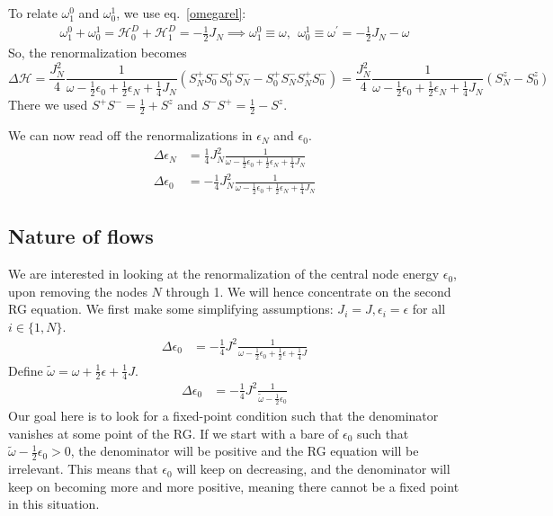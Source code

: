 To relate \(\omega_1^0\) and \(\omega_0^1\), we use eq.~\ref{omegarel}:
\begin{equation}\begin{aligned}
	\omega_1^0 + \omega_0^1 = \mathcal{H}^D_0 + \mathcal{H}^D_1 = -\frac{1}{2}J_N \implies \omega_1^0 \equiv \omega, ~ ~\omega_0^1 \equiv \omega^\prime = -\frac{1}{2}J_N - \omega
\end{aligned}\end{equation}
So, the renormalization becomes
\begin{equation}
	\Delta \mathcal{H} = \frac{J_N^2}{4}\frac{1}{\omega - \frac{1}{2}\epsilon_0  + \frac{1}{2}\epsilon_N + \frac{1}{4}J_N}\left(S_N^+ S_0^- S_0^+  S_N^- - S_0^+  S_N^- S_N^+ S_0^-\right) = \frac{J_N^2}{4}\frac{1}{\omega - \frac{1}{2}\epsilon_0  + \frac{1}{2}\epsilon_N + \frac{1}{4}J_N}\left(S_N^z - S_0^z\right)
\end{equation}
There we used  \(S^+ S^- = \frac{1}{2} + S^z\) and \(S^- S^+ = \frac{1}{2} - S^z\).

We can now read off the renormalizations in \(\epsilon_N\) and \(\epsilon_0\).
\begin{equation}\begin{aligned}
	\Delta \epsilon_N &= \frac{1}{4}J_N^2 \frac{1}{\omega - \frac{1}{2}\epsilon_0 + \frac{1}{2}\epsilon_N + \frac{1}{4}J_N}\\
	\Delta \epsilon_0 &= -\frac{1}{4}J_N^2 \frac{1}{\omega - \frac{1}{2}\epsilon_0 + \frac{1}{2}\epsilon_N + \frac{1}{4}J_N}
\end{aligned}\end{equation}
\subsection{Nature of flows}
We are interested in looking at the renormalization of the central node energy \(\epsilon_0\), upon removing the nodes \(N\) through 1. We will hence concentrate on the second RG equation. We first make some simplifying assumptions: \(J_i = J, \epsilon_i = \epsilon\) for all \(i\in\{1,N\}\).
\begin{equation}\begin{aligned}
	\label{stareq}
	\Delta \epsilon_0 &= -\frac{1}{4}J^2 \frac{1}{\omega - \frac{1}{2}\epsilon_0 + \frac{1}{2}\epsilon + \frac{1}{4}J}
\end{aligned}\end{equation}
Define \(\tilde\omega = \omega + \frac{1}{2}\epsilon + \frac{1}{4}J\).
\begin{equation}\begin{aligned}
	\Delta \epsilon_0 &= -\frac{1}{4}J^2 \frac{1}{\tilde \omega - \frac{1}{2}\epsilon_0}
\end{aligned}\end{equation}
Our goal here is to look for a fixed-point condition such that the denominator vanishes at some point of the RG. If we start with a bare of \(\epsilon_0\) such that \(\tilde \omega - \frac{1}{2}\epsilon_0 > 0\), the denominator will be positive and the RG equation will be irrelevant. This means that \(\epsilon_0\) will keep on decreasing, and the denominator will keep on becoming more and more positive, meaning there cannot be a fixed point in this situation.

